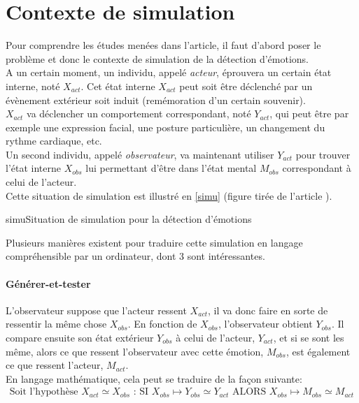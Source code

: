\documentclass[poster]{polytech/polytech}
\begin{document}
\section{Contexte de simulation}
Pour comprendre les études menées dans l'article, il faut d'abord poser le problème et donc le contexte de simulation de la détection d'émotions.\\
A un certain moment, un individu, appelé \textit{acteur}, éprouvera un certain état interne, noté $X_{act}$. Cet état interne $X_{act}$ peut soit être déclenché par un évènement extérieur soit induit (remémoration d'un certain souvenir).\\
$X_{act}$ va déclencher un comportement correspondant, noté $Y_{act}$, qui peut être par exemple une expression facial, une posture particulière, un changement du rythme cardiaque, etc.\\
Un second individu, appelé \textit{observateur}, va maintenant utiliser $Y_{act}$ pour trouver l'état interne $X_{obs}$ lui permettant d'être dans l'état mental $M_{obs}$ correspondant à celui de l'acteur.\\
Cette situation de simulation est illustré en \autoref{simu} (figure tirée de l'article \cite{italiens}).

\begin{Figure}{simu}{Situation de simulation pour la détection d'émotions}
\end{Figure}

Plusieurs manières existent pour traduire cette simulation en langage compréhensible par un ordinateur, dont 3 sont intéressantes.

\paragraph{Générer-et-tester}
L'observateur suppose que l'acteur ressent $X_{act}$, il va donc faire en sorte de ressentir la même chose $X_{obs}$. En fonction de $X_{obs}$, l'observateur obtient $Y_{obs}$. Il compare ensuite son état extérieur $Y_{obs}$ à celui de l'acteur, $Y_{act}$, et si se sont les même, alors ce que ressent l'observateur avec cette émotion, $M_{obs}$, est également ce que ressent l'acteur, $M_{act}$.\\
En langage mathématique, cela peut se traduire de la façon suivante:
\begin{align*}
\text{Soit l'hypothèse }X_{act}\simeq X_{obs}\text{ : SI } X_{obs}\mapsto Y_{obs}\simeq Y_{act} \text{ ALORS } X_{obs}\mapsto M_{obs}\simeq M_{act}
\end{align*}
\end{document}
